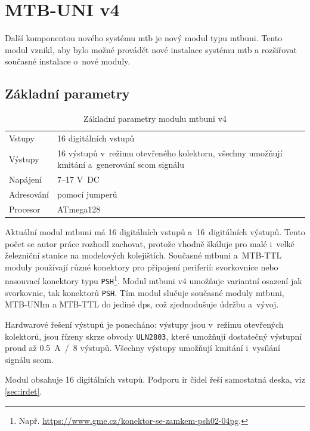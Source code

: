 \newpage
\section{MTB-UNI v4}

Další komponentou nového systému \gls{mtb} je nový modul typu \gls{mtbuni}.
Tento modul vznikl, aby bylo možné provádět nové instalace systému \gls{mtb}
a rozšiřovat současné instalace o~nové moduly.

\subsection{Základní parametry}

\begin{table}[h]
	\begin{tabularx}{\textwidth}{lX}
		\toprule
		Vstupy & 16 digitálních vstupů \\
		Výstupy & 16 výstupů v~režimu otevřeného kolektoru, všechny umožňují
		kmitání a~generování \gls{scom} signálu \\
		Napájení & 7–17 V~DC \\
		Adresování & pomocí jumperů \\
		Procesor & ATmega128 \\
		\bottomrule
	\end{tabularx}
	\caption{Základní parametry modulu \gls{mtbuni} v4}
	\label{tab:mtbuni-params}
\end{table}

Aktuální modul \gls{mtbuni} má 16 digitálních vstupů a~16~digitálních výstupů.
Tento počet se autor práce rozhodl zachovat, protože vhodně škáluje pro malé
i~velké železniční stanice na modelových kolejištích.
Současné \gls{mtbuni} a~MTB-TTL moduly používají různé konektory
pro připojení periferií: svorkovnice nebo nasouvací konektory typu
\texttt{PSH}\footnote{Např. \url{https://www.gme.cz/konektor-se-zamkem-psh02-04pg}.}.
Modul \gls{mtbuni} v4 umožňuje variantní osazení jak svorkovnic, tak konektorů
\texttt{PSH}. Tím modul slučuje současné moduly \gls{mtbuni}, MTB-UNIm a
MTB-TTL do jediné \gls{dps}, což zjednodušuje údržbu a~vývoj.

Hardwarové řešení výstupů je ponecháno: výstupy jsou v~režimu otevřených
kolektorů, jsou řízeny skrze obvody \texttt{ULN2803}, které umožňují
dostatečný výstupní proud až 0.5~A~/~8 výstupů. Všechny výstupy umožňují kmitání
i~vysílání signálu \gls{scom}.

Modul obsahuje 16 digitálních vstupů. Podporu \gls{ir} čidel řeší samostatná
deska, viz \ref{sec:irdet}.

